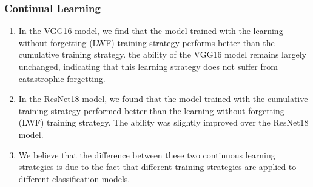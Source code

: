 \documentclass[lang=english,inputenc=utf8,fontsize=10pt]{ldvarticle}
\begin{document}
\subsubsection{Continual Learning}
    \begin{enumerate}
        \item In the VGG16 model, we find that the model trained with the learning without forgetting (LWF) training strategy performs better than the cumulative training strategy. the ability of the VGG16 model remains largely unchanged, indicating that this learning strategy does not suffer from catastrophic forgetting.
        \item In the ResNet18 model, we found that the model trained with the cumulative training strategy performed better than the learning without forgetting (LWF) training strategy. The ability was slightly improved over the ResNet18 model.
        \item We believe that the difference between these two continuous learning strategies is due to the fact that different training strategies are applied to different classification models.
    \end{enumerate}    
\end{document}
